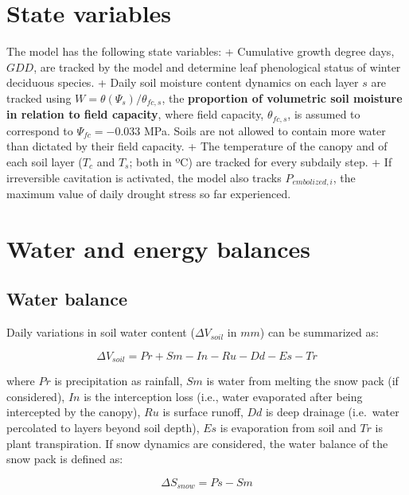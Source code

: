 \documentclass[]{book}
\begin{document}
\section{State variables}\label{state-variables-1}

The model has the following state variables: + Cumulative growth degree
days, \(GDD\), are tracked by the model and determine leaf phenological
status of winter deciduous species. + Daily soil moisture content
dynamics on each layer \(s\) are tracked using
\(W = \theta(\Psi_s)/ \theta_{fc,s}\), the \textbf{proportion of
volumetric soil moisture in relation to field capacity}, where field
capacity, \(\theta_{fc,s}\), is assumed to correspond to
\(\Psi_{fc} = -0.033\) MPa. Soils are not allowed to contain more water
than dictated by their field capacity. + The temperature of the canopy
and of each soil layer (\(T_c\) and \(T_s\); both in ºC) are tracked for
every subdaily step. + If irreversible cavitation is activated, the
model also tracks \(P_{embolized,i}\), the maximum value of daily
drought stress so far experienced.

\section{Water and energy balances}\label{water-and-energy-balances}

\subsection{Water balance}\label{water-balance-1}

Daily variations in soil water content (\(\Delta{V_{soil}}\) in \(mm\))
can be summarized as:

\begin{equation}
\Delta{V_{soil}} = Pr + Sm - In - Ru - Dd - Es -Tr
\end{equation}

where \(Pr\) is precipitation as rainfall, \(Sm\) is water from melting
the snow pack (if considered), \(In\) is the interception loss (i.e.,
water evaporated after being intercepted by the canopy), \(Ru\) is
surface runoff, \(Dd\) is deep drainage (i.e.~water percolated to layers
beyond soil depth), \(Es\) is evaporation from soil and \(Tr\) is plant
transpiration. If snow dynamics are considered, the water balance of the
snow pack is defined as:

\begin{equation}
\Delta{S_{snow}} = Ps - Sm
\end{equation}
\end{document}
